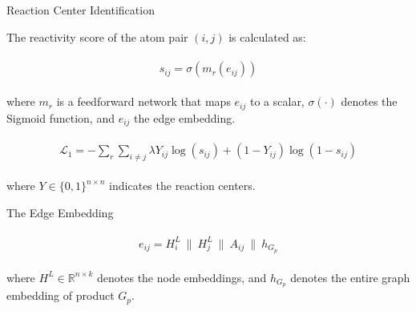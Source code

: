 \documentclass{beamer}		%
\begin{document}
\begin{frame}{Reaction Center Identification}

The reactivity score of the atom pair $(i, j)$ is calculated as:

\begin{eqnarray}
\begin{aligned}
s_{ij} = \sigma(m_r(e_{ij}))
\end{aligned}    
\end{eqnarray}

where $m_r$ is a feedforward network that maps $e_{ij}$ to a scalar, $\sigma(\cdot)$ denotes the Sigmoid function, and $e_{ij}$ the edge embedding.

\pause

\begin{eqnarray}
\begin{aligned}
\mathcal{L}_1 = - \sum_r \sum_{i \ne j} \lambda Y_{ij} \log(s_{ij}) + (1-Y_{ij})\log(1-s_{ij})
\end{aligned}    
\end{eqnarray}

where $Y \in \{0,1\}^{n \times n}$ indicates the reaction centers.

\end{frame}









\begin{frame}{The Edge Embedding}

\begin{eqnarray}
\begin{aligned}
e_{ij} = H_i^L \ \| \ H_j^L \ \| \ A_{ij} \ \| \ h_{G_p}
\end{aligned}    
\end{eqnarray}

where $H^L \in \mathbb{R}^{n \times k}$ denotes the node embeddings, and $h_{G_p}$ denotes the entire graph embedding of product $G_p$.




\end{frame}
\end{document}
